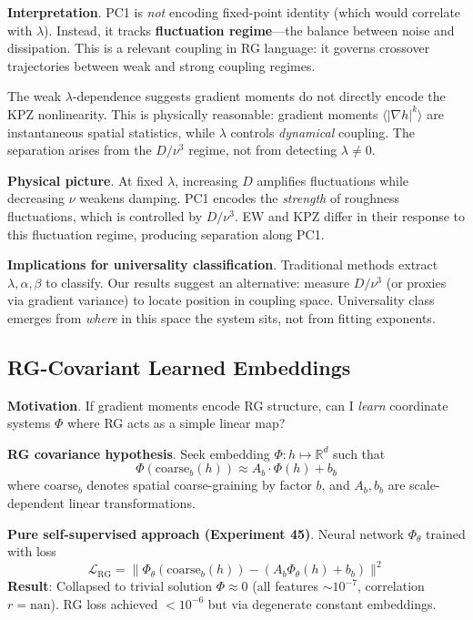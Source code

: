 \documentclass[aps,pre,reprint,amsmath,amssymb,superscriptaddress]{revtex4-2}
\newcommand{\bbR}{\mathbb{R}}
\begin{document}
\textbf{Interpretation}. PC1 is \textit{not} encoding fixed-point identity (which would correlate with $\lambda$). Instead, it tracks \textbf{fluctuation regime}---the balance between noise and dissipation. This is a relevant coupling in RG language: it governs crossover trajectories between weak and strong coupling regimes.

The weak $\lambda$-dependence suggests gradient moments do not directly encode the KPZ nonlinearity. This is physically reasonable: gradient moments $\langle |\nabla h|^k \rangle$ are instantaneous spatial statistics, while $\lambda$ controls \textit{dynamical} coupling. The separation arises from the $D/\nu^3$ regime, not from detecting $\lambda \neq 0$.

\textbf{Physical picture}. At fixed $\lambda$, increasing $D$ amplifies fluctuations while decreasing $\nu$ weakens damping. PC1 encodes the \textit{strength} of roughness fluctuations, which is controlled by $D/\nu^3$. EW and KPZ differ in their response to this fluctuation regime, producing separation along PC1.

\textbf{Implications for universality classification}. Traditional methods extract $\lambda, \alpha, \beta$ to classify. Our results suggest an alternative: measure $D/\nu^3$ (or proxies via gradient variance) to locate position in coupling space. Universality class emerges from \textit{where} in this space the system sits, not from fitting exponents.

\subsection{RG-Covariant Learned Embeddings}
\label{sec:learned}

\textbf{Motivation}. If gradient moments encode RG structure, can I \textit{learn} coordinate systems $\Phi$ where RG acts as a simple linear map?

\textbf{RG covariance hypothesis}. Seek embedding $\Phi: h \mapsto \bbR^d$ such that
\begin{equation}
\Phi(\text{coarse}_b(h)) \approx A_b \cdot \Phi(h) + b_b
\label{eq:rg-covariance}
\end{equation}
where $\text{coarse}_b$ denotes spatial coarse-graining by factor $b$, and $A_b, b_b$ are scale-dependent linear transformations.

\textbf{Pure self-supervised approach (Experiment 45)}. Neural network $\Phi_\theta$ trained with loss
\begin{equation}
\mathcal{L}_{\text{RG}} = \| \Phi_\theta(\text{coarse}_b(h)) - (A_b \Phi_\theta(h) + b_b) \|^2
\end{equation}
\textbf{Result}: Collapsed to trivial solution $\Phi \approx 0$ (all features $\sim 10^{-7}$, correlation $r = \text{nan}$). RG loss achieved $<10^{-6}$ but via degenerate constant embeddings.
\end{document}
